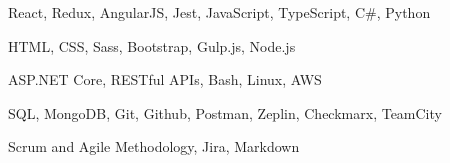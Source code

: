 \begin{zitemize}
\item React, Redux, AngularJS, Jest, JavaScript, TypeScript, C\#, Python
\item HTML, CSS, Sass, Bootstrap, Gulp.js, Node.js
\item ASP.NET Core, RESTful APIs, Bash, Linux, AWS
\item SQL, MongoDB, Git, Github, Postman, Zeplin, Checkmarx, TeamCity
\item Scrum and Agile Methodology, Jira, Markdown
\end{zitemize}